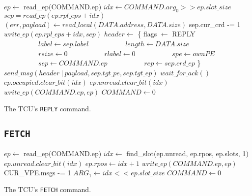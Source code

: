 \begin{algorithm}[H]
    $ep \gets$ read\_ep(COMMAND.ep)\;
    \BlankLine
    $idx \gets COMMAND.arg_0 >> ep.slot\_size$\;
    $sep = read\_ep(ep.rpl\_eps + idx)$\;
    \BlankLine
    $(err, payload) \gets read\_local(DATA.address, DATA.size)$\;
    \BlankLine
    sep.cur\_crd -= 1\;
    $write\_ep(ep.rpl\_eps + idx, sep)$\;
    \BlankLine
    $header \gets$ \{ flags $\gets$ REPLY\;
    $\quad\quad\quad\quad\quad label \gets sep.label$\;
    $\quad\quad\quad\quad\quad length \gets DATA.size$\;
    $\quad\quad\quad\quad\quad rsize \gets 0$\;
    $\quad\quad\quad\quad\quad rlabel \gets 0$\;
    $\quad\quad\quad\quad\quad spe \gets ownPE$\;
    $\quad\quad\quad\quad\quad sep \gets COMMAND.ep$\;
    $\quad\quad\quad\quad\quad rep \gets sep.crd\_ep$ \}\;
    $send\_msg(header\ |\ payload, sep.tgt\_pe, sep.tgt\_ep)$\;
    $wait\_for\_ack()$\;
    \BlankLine
    \cbstart
    \cbend
    \BlankLine
    $ep.occupied.clear\_bit(idx)$\;
    $ep.unread.clear\_bit(idx)$\;
    $write\_ep(COMMAND.ep, ep)$\;
    \BlankLine
    $COMMAND \gets 0$\;
    \caption{The TCU's \texttt{REPLY} command.}
\end{algorithm}

\subsection{\texttt{FETCH}}

\begin{algorithm}[H]
    $ep \gets$ read\_ep(COMMAND.ep)\;
    \BlankLine
    $idx \gets$ find\_slot(ep.unread, ep.rpos, ep.slots, 1)\;
    $ep.unread.clear\_bit(idx)$\;
    $ep.rpos \gets idx + 1$\;
    $write\_ep(COMMAND.ep, ep)$\;
    \BlankLine
    \cbstart
    CUR\_VPE.msgs -= 1\;
    \cbend
    \BlankLine
    $ARG_1 \gets idx << ep.slot\_size$\;
    $COMMAND \gets 0$\;
    \caption{The TCU's \texttt{FETCH} command.}
\end{algorithm}

